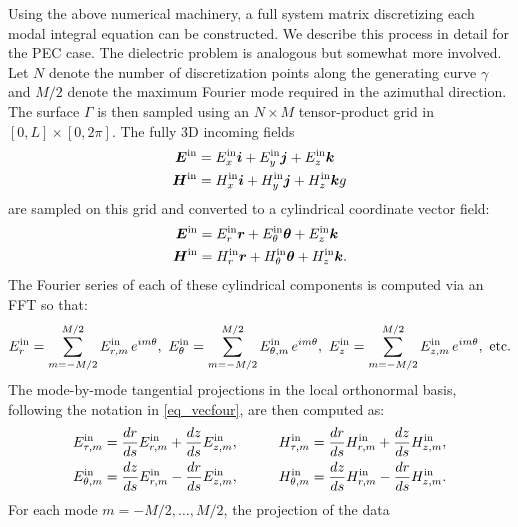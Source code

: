 \documentclass[11pt]{article}
\newcommand{\vct}{\vectorsym}
\newcommand\ihat{\vct{{i}}}
\newcommand\jhat{\vct{{j}}}
\newcommand\khat{\vct{{k}}}
\newcommand\rhat{\vct{{r}}}
\newcommand\thetahat{{\vct{{\theta}}}}
\newcommand\bEin{\vct{E}^\textnormal{in}}
\newcommand\bHin{\vct{H}^\textnormal{in}}
\newcommand\Ein{E^\textnormal{in}}
\newcommand\Hin{H^\textnormal{in}}
\numberwithin{equation}{section}
\begin{document}
Using the above numerical machinery, a full system matrix discretizing
each modal integral equation can be constructed.
We describe this process in detail for the PEC case. The dielectric
problem is analogous but somewhat more involved.
Let $N$ denote the number of discretization points along the
generating curve $\gamma$ and $M/2$ denote the maximum Fourier mode
required in the azimuthal direction. The surface $\Gamma$ is then
sampled using an $N \times M$ tensor-product grid in $[0,L] \times
[0,2\pi]$. The fully 3D incoming fields
\begin{equation}
  \begin{aligned}
    \bEin &= \Ein_x \ihat + \Ein_y \jhat + \Ein_z \khat \\
    \bHin &= \Hin_x \ihat + \Hin_y \jhat + \Hin_z \khat
g  \end{aligned}
\end{equation}
are sampled on this grid and converted to a cylindrical coordinate
vector field:
\begin{equation}
  \begin{aligned}
    \bEin &= \Ein_r \rhat + \Ein_\theta \thetahat + \Ein_z \khat \\
    \bHin &= \Hin_r \rhat + \Hin_\theta \thetahat + \Hin_z \khat.
  \end{aligned}
\end{equation}
The Fourier series of each of these cylindrical components is computed
via an FFT so that:
\begin{equation}
  \Ein_r = \sum_{m = -M/2}^{M/2} \Ein_{r,m} \, e^{im\theta},\ 
  \Ein_\theta = \sum_{m = -M/2}^{M/2} \Ein_{\theta,m} \, e^{im\theta},\ 
  \Ein_z = \sum_{m = -M/2}^{M/2} \Ein_{z,m} \, e^{im\theta},\ {\rm etc.}
\end{equation}
The mode-by-mode tangential projections in the local orthonormal basis,
following the notation in \eqref{eq_vecfour},
are then computed as:
\begin{equation}
  \begin{aligned}
    \Ein_{\tau,m} &= \frac{dr}{ds} \Ein_{r,m} + \frac{dz}{ds}
    \Ein_{z,m}, &\qquad \Hin_{\tau,m} &= \frac{dr}{ds} \Hin_{r,m} + \frac{dz}{ds}
    \Hin_{z,m}, \\
    \Ein_{\theta,m} &= \frac{dz}{ds} \Ein_{r,m} - \frac{dr}{ds}
    \Ein_{z,m}, &\qquad \Hin_{\theta,m} &= \frac{dz}{ds} \Hin_{r,m} - \frac{dr}{ds}
    \Hin_{z,m}.
  \end{aligned}
\end{equation}
For each mode $m = -M/2,\ldots, M/2$, the projection of the data
\end{document}
